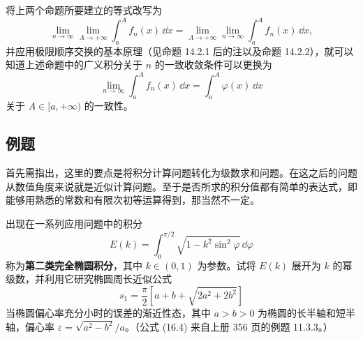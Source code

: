\begin{xremark}
将上两个命题所要建立的等式改写为
\begin{equation}
  \lim_{n\to\infty}\lim_{A\to+\infty}\int_a^A f_n(x)\,\dd x
  =\lim_{A\to+\infty}\lim_{n\to\infty}\int_a^A f_n(x)\,\dd x,
\tag{16.2}
\label{eq:16.2}
\end{equation}
并应用极限顺序交换的基本原理（见命题 14.2.1 后的注以及命题 14.2.2），就可以知道上述命题中的广义积分关于 $n$ 的一致收敛条件可以更换为
\[
  \lim_{n\to\infty}\int_a^A f_n(x)\,\dd x=\int_a^A\varphi(x)\,\dd x
\]
关于 $A\in[a,+\infty)$ 的一致性。
\end{xremark}

\subsection{例题}

首先需指出，这里的要点是将积分计算问题转化为级数求和问题。在这之后的问题从数值角度来说就是近似计算问题。至于是否所求的积分值都有简单的表达式，即能够用熟悉的常数和有限次初等运算得到，那当然不一定。

\begin{xexample}[16.1.1]
出现在一系列应用问题中的积分
\begin{equation}
  E(k)=\int_0^{\pi/2}\sqrt{1-k^2\sin^2\varphi}\,\dd\varphi
\tag{16.3}
\label{eq:16.3}
\end{equation}
称为\textbf{第二类完全椭圆积分}，其中 $k\in(0,1)$ 为参数。试将 $E(k)$ 展开为 $k$ 的幂级数，并利用它研究椭圆周长近似公式
\begin{equation}
  s_1=\frac{\pi}{2}\left[a+b+\sqrt{2a^2+2b^2}\right]
\tag{16.4}
\label{eq:16.4}
\end{equation}
当椭圆偏心率充分小时的误差的渐近性态，其中 $a>b>0$ 为椭圆的长半轴和短半轴，偏心率 $\varepsilon=\sqrt{a^2-b^2}/a$。（公式 (16.4) 来自上册 356 页的例题 11.3.3。）
\end{xexample}

